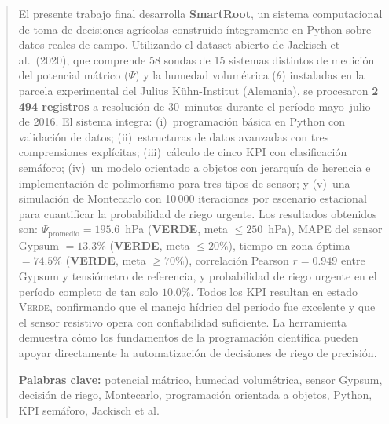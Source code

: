 \documentclass[12pt,a4paper]{article}
\begin{document}
\begin{abstract}
\noindent
El presente trabajo final desarrolla \textbf{SmartRoot}, un sistema computacional de toma de decisiones agrícolas construido íntegramente en Python sobre datos reales de campo. Utilizando el dataset abierto de Jackisch et al.\ (2020), que comprende 58 sondas de 15 sistemas distintos de medición del potencial mátrico ($\Psi$) y la humedad volumétrica ($\theta$) instaladas en la parcela experimental del Julius Kühn-Institut (Alemania), se procesaron \textbf{2\,494 registros} a resolución de 30~minutos durante el período mayo--julio de 2016. El sistema integra: (i)~programación básica en Python con validación de datos; (ii)~estructuras de datos avanzadas con tres comprensiones explícitas; (iii)~cálculo de cinco KPI con clasificación semáforo; (iv)~un modelo orientado a objetos con jerarquía de herencia e implementación de polimorfismo para tres tipos de sensor; y (v)~una simulación de Montecarlo con 10\,000 iteraciones por escenario estacional para cuantificar la probabilidad de riego urgente. Los resultados obtenidos son: $\Psi_{\text{promedio}} = 195.6$~hPa (\textcolor{verdeKPI}{\textbf{VERDE}}, meta $\leq 250$~hPa), MAPE del sensor Gypsum $= 13.3\%$ (\textcolor{verdeKPI}{\textbf{VERDE}}, meta $\leq 20\%$), tiempo en zona óptima $= 74.5\%$ (\textcolor{verdeKPI}{\textbf{VERDE}}, meta $\geq 70\%$), correlación Pearson $r = 0.949$ entre Gypsum y tensiómetro de referencia, y probabilidad de riego urgente en el período completo de tan solo $10.0\%$. Todos los KPI resultan en estado \textsc{Verde}, confirmando que el manejo hídrico del período fue excelente y que el sensor resistivo opera con confiabilidad suficiente. La herramienta demuestra cómo los fundamentos de la programación científica pueden apoyar directamente la automatización de decisiones de riego de precisión.

\vspace{0.3cm}
\noindent\textbf{Palabras clave:} potencial mátrico, humedad volumétrica, sensor Gypsum, decisión de riego, Montecarlo, programación orientada a objetos, Python, KPI semáforo, Jackisch et al.
\end{abstract}

\newpage
\tableofcontents
\newpage

\end{document}
